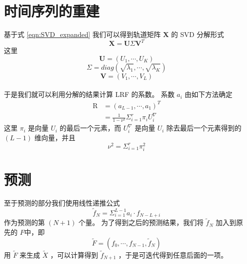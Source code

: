 \documentclass[a4paper]{article}
\begin{document}
\section{时间序列的重建}
基于式 \ref{eqn:SVD_expanded} 我们可以得到轨道矩阵 $\textbf{X}$ 的 SVD 分解形式
\begin{equation}
	\label{eqn:SVD}
	\textbf{X} = \textbf{U} \Sigma \textbf{V}^T
\end{equation}
这里
\begin{equation}
	\label{eqn:SVD_U}
	\textbf{U} = (U_1, \cdots, U_K)
\end{equation}
\begin{equation}
	\label{eqn:SVD_Sigma}
	\Sigma = diag(\sqrt{\lambda_1}, \cdots, \sqrt{\lambda_K})
\end{equation}
\begin{equation}
	\label{eqn:SVD_V} 
	\textbf{V} = (V_1, \cdots, V_L)
\end{equation}
\\
\indent 于是我们就可以利用分解的结果计算 LRF 的系数。
系数 $a_i$ 由如下方法确定
\begin{align}
	\textrm{R} &= (a_{L-1}, \cdots, a_1)^T \\
	           &= \frac{1}{1-\nu^2} \Sigma_{i=1}^r \pi_i U_i^\nabla \label{eqn:R_a}
\end{align}
这里 $\pi_i$ 是向量 $U_i$ 的最后一个元素，而 $U_i^\nabla$ 是向量 $U_i$ 除去最后一个元素得到的 $(L-1)$ 维向量，并且
\begin{equation}
	\label{eqn:ssa_nu^2}
	\nu^2 = \Sigma_{i=1}^r \pi_i^2
\end{equation}

\section{预测}
至于预测的部分我们使用线性递推公式
\begin{equation}
	\label{eqn:ssa_prediction}
	\tilde{f}_N = \Sigma_{i=1}^{L-1} a_i \cdot f_{N-L+i} 
\end{equation}
作为预测的第 $(N+1)$ 个量。
为了得到之后的预测结果，我们将 $\tilde{f}_N$ 加入到原先的 $F$中，即
\begin{equation}
	\label{eqn:ssa_new_f}
	\tilde{F} = (f_0, \cdots, f_{N-1}, \tilde{f}_N)
\end{equation}
用 $\tilde{F}$ 来生成 $\tilde{X}$ ，可以计算得到 $\tilde{f}_{N+1}$ ，于是可迭代得到任意后面的一项。
\end{document}

